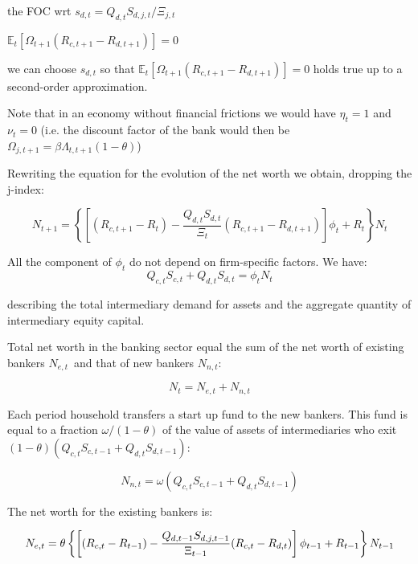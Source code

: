 \documentclass{article}
\begin{document}
the FOC wrt $s_{d,t}=Q_{d,t}S_{d,j,t}/\Xi _{j,t}$

$\mathbb{E}_{t}\left[ \Omega _{t+1}(R_{c,t+1}-R_{d,t+1})\right] =0$

we can choose $s_{d,t}$ so that $\mathbb{E}_{t}\left[ \Omega
_{t+1}(R_{c,t+1}-R_{d,t+1})\right] =0$ holds true up to a second-order
approximation.

Note that in an economy without financial frictions we would have $\eta
_{t}=1$ and $\nu _{t}=0$ (i.e. the discount factor of the bank would then be 
$\Omega _{j,t+1}=\beta \Lambda _{t,t+1}(1-\theta )$)

Rewriting the equation for the evolution of the net worth we obtain,
dropping the j-index:

\begin{equation*}
N_{t+1}=\left\{ \left[ (R_{c,t+1}-R_{t})-\frac{Q_{d,t}S_{d,t}}{\Xi _{t}}%
(R_{c,t+1}-R_{d,t+1})\right] \phi _{t}+R_{t}\right\} N_{t}
\end{equation*}

All the component of $\phi _{t}$ do not depend on firm-specific factors. We
have:%
\begin{equation*}
Q_{c,t}S_{c,t}+Q_{d,t}S_{d,t}=\phi _{t}N_{t}
\end{equation*}

describing the total intermediary demand for assets and the aggregate
quantity of intermediary equity capital.

Total net worth in the banking sector equal the sum of the net worth of
existing bankers $N_{e,t}$\ and that of new bankers $N_{n,t}$:

\begin{equation*}
N_{t}=N_{e,t}+N_{n,t}
\end{equation*}

Each period household transfers a start up fund to the new bankers. This
fund is equal to a fraction $\omega /(1-\theta )$ of the value of assets of
intermediaries who exit $(1-\theta )(Q_{c,t}S_{c,t-1}+Q_{d,t}S_{d,t-1})$:

\begin{equation*}
N_{n,t}=\omega (Q_{c,t}S_{c,t-1}+Q_{d,t}S_{d,t-1})
\end{equation*}

\bigskip The net worth for the existing bankers is:

\begin{equation*}
N_{e,t}=\theta \left\{ \left[ (R_{c,t}-R_{t-1})-\frac{Q_{d,t-1}S_{d,j,t-1}}{%
\Xi _{t-1}}(R_{c,t}-R_{d,t})\right] \phi _{t-1}+R_{t-1}\right\} N_{t-1}
\end{equation*}
\end{document}
